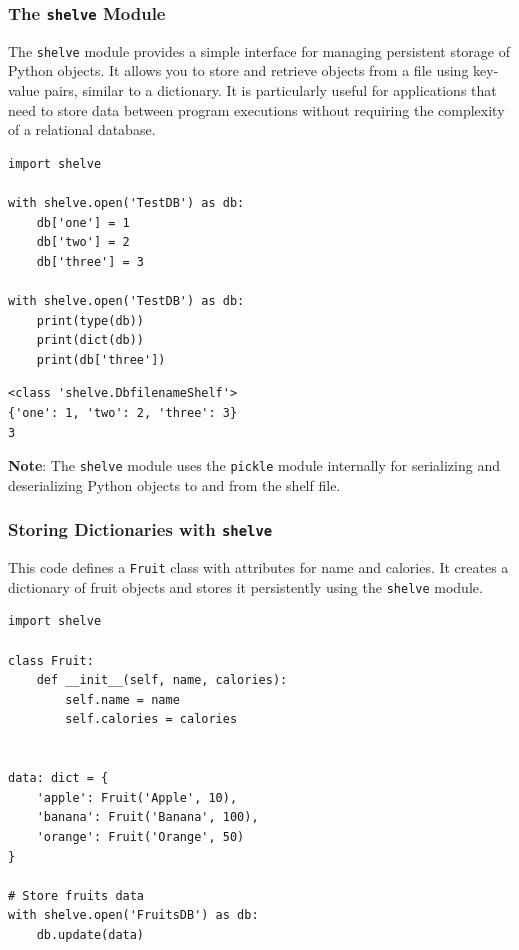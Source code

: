 \subsubsection{The \texttt{shelve} Module}
The \texttt{shelve} module provides a simple interface for managing persistent storage of Python objects. It allows you to store and retrieve objects from a file using key-value pairs, similar to a dictionary. It is particularly useful for applications that need to store data between program executions without requiring the complexity of a relational database.\\

\begin{codebox}
\begin{verbatim}
import shelve

with shelve.open('TestDB') as db:
    db['one'] = 1
    db['two'] = 2
    db['three'] = 3

with shelve.open('TestDB') as db:
    print(type(db))
    print(dict(db))
    print(db['three'])
\end{verbatim}
\end{codebox}


\begin{verbatim}
<class 'shelve.DbfilenameShelf'>
{'one': 1, 'two': 2, 'three': 3}
3
\end{verbatim}

\textbf{Note}: The \texttt{shelve} module uses the \texttt{pickle} module internally for serializing and deserializing Python objects to and from the shelf file.

\newpage
\subsubsection{Storing Dictionaries with \texttt{shelve}}
This code defines a \texttt{Fruit} class with attributes for name and calories. It creates a dictionary of fruit objects and stores it persistently using the \texttt{shelve} module. 

\begin{codebox}
\begin{verbatim}
import shelve

class Fruit:
    def __init__(self, name, calories):
        self.name = name
        self.calories = calories


data: dict = {
    'apple': Fruit('Apple', 10),
    'banana': Fruit('Banana', 100),
    'orange': Fruit('Orange', 50)
}

# Store fruits data
with shelve.open('FruitsDB') as db:
    db.update(data)
\end{verbatim}
\end{codebox}

